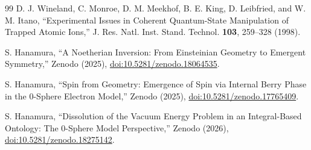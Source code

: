 \documentclass[%
 reprint,
 amsmath,amssymb,
 aps,
 prb,
]{revtex4-2}
\numberwithin{equation}{section}
\begin{document}
\begin{thebibliography}{99}
D. J. Wineland, C. Monroe, D. M. Meekhof, B. E. King, D. Leibfried, and W. M. Itano, ``Experimental Issues in Coherent Quantum-State Manipulation of Trapped Atomic Ions,'' J. Res. Natl. Inst. Stand. Technol. \textbf{103}, 259--328 (1998).

S. Hanamura, ``A Noetherian Inversion: From Einsteinian Geometry to Emergent Symmetry,'' Zenodo (2025), \href{https://doi.org/10.5281/zenodo.18064535}{doi:10.5281/zenodo.18064535}.

S. Hanamura, ``Spin from Geometry: Emergence of Spin via Internal Berry Phase in the 0-Sphere Electron Model,'' Zenodo (2025), \href{https://doi.org/10.5281/zenodo.17765409}{doi:10.5281/zenodo.17765409}.

S. Hanamura, ``Dissolution of the Vacuum Energy Problem in an Integral-Based Ontology: The 0-Sphere Model Perspective,'' Zenodo (2026), \href{https://doi.org/10.5281/zenodo.18275142}{doi:10.5281/zenodo.18275142}.

\end{thebibliography}
\end{document}
